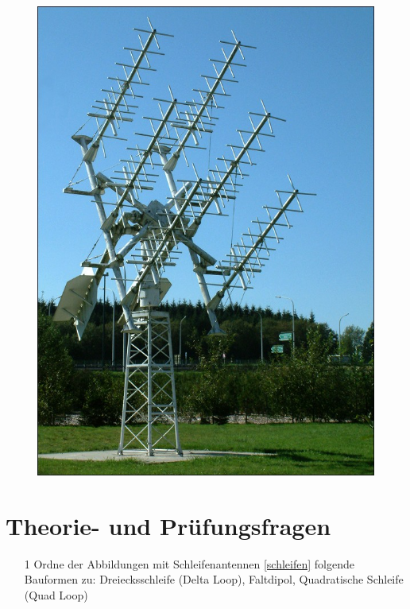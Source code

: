 \begin{figure}
 \vspace{-6cm}
  \includegraphics[scale=0.2]{Antennen/Bilder/Kreuzdipolarp.jpg}
 \vspace{-6cm}
\end{figure}

\section*{Theorie- und Prüfungsfragen}


\begin{enumerate} 
\itemsep1pt\parskip0pt
\item[1] Ordne der Abbildungen mit Schleifenantennen \ref{schleifen} folgende Bauformen zu: Dreiecksschleife (Delta Loop), Faltdipol, Quadratische Schleife (Quad Loop)
\end{enumerate}

